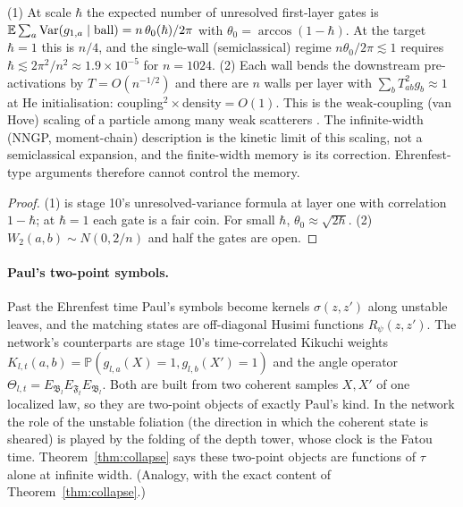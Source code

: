 \begin{proposition}\label{prop:kinetic}
(1) At scale $\hbar$ the expected number of unresolved first-layer gates is $\mathbb E\sum_a\operatorname{Var}(g_{1,a}\mid\text{ball})=n\,\theta_0(\hbar)/2\pi$ with
$\theta_0=\arccos(1-\hbar)$. At the target $\hbar=1$ this is $n/4$, and the single-wall (semiclassical) regime $n\theta_0/2\pi\lesssim1$ requires
$\hbar\lesssim2\pi^2/n^2\approx1.9\times10^{-5}$ for $n=1024$. (2) Each wall bends the downstream pre-activations by $T=O(n^{-1/2})$ and there are
$n$ walls per layer with $\sum_bT_{ab}^2g_b\approx1$ at He initialisation: coupling$^2\times$density$=O(1)$. This is the weak-coupling
(van Hove) scaling of a particle among many weak scatterers \cite{EY}. The infinite-width (NNGP, moment-chain) description is the
kinetic limit of this scaling, not a semiclassical expansion, and the finite-width memory is its correction. Ehrenfest-type arguments
therefore cannot control the memory.
\end{proposition}
\begin{proof}
(1) is stage 10's unresolved-variance formula at layer one with correlation $1-\hbar$; at $\hbar=1$ each gate is a fair coin. For small
$\hbar$, $\theta_0\approx\sqrt{2\hbar}$. (2) $W_2(a,b)\sim N(0,2/n)$ and half the gates are open.
\end{proof}

\paragraph{Paul's two-point symbols.} Past the Ehrenfest time Paul's symbols become kernels $\sigma(z,z')$ along unstable leaves, and the
matching states are off-diagonal Husimi functions $R_\psi(z,z')$. The network's counterparts are stage 10's time-correlated Kikuchi weights
$K_{l,t}(a,b)=\mathbb P(g_{l,a}(X)=1,g_{l,b}(X')=1)$ and the angle operator $\Theta_{l,t}=E_{\mathfrak B_l}E_{\mathfrak F_t}E_{\mathfrak B_l}$. Both are built
from two coherent samples $X,X'$ of one localized law, so they are two-point objects of exactly Paul's kind. In the network the role of the
unstable foliation (the direction in which the coherent state is sheared) is played by the folding of the depth tower, whose clock is
the Fatou time. Theorem~\ref{thm:collapse} says these two-point objects are functions of $\tau$ alone at infinite width. (Analogy, with
the exact content of Theorem~\ref{thm:collapse}.)

